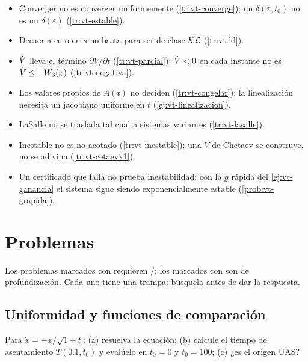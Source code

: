 \begin{trampa}[title={\faBug\hspace{0.45em}Las trampas del capítulo, en una caja}]{}
\begin{itemize}
  \item Converger no es converger uniformemente (\cref{tr:vt-converge}); un $\delta(\varepsilon,t_0)$ no es un $\delta(\varepsilon)$ (\cref{tr:vt-estable}).
  \item Decaer a cero en $s$ no basta para ser de clase $\mathcal{KL}$ (\cref{tr:vt-kl}).
  \item $\dot V$ lleva el término $\partial V/\partial t$ (\cref{tr:vt-parcial}); $\dot V<0$ en cada instante no es $\dot V\le-W_3(x)$ (\cref{tr:vt-negativa}).
  \item Los valores propios de $A(t)$ no deciden (\cref{tr:vt-congelar}); la linealización necesita un jacobiano uniforme en $t$ (\cref{ej:vt-linealizacion}).
  \item LaSalle no se traslada tal cual a sistemas variantes (\cref{tr:vt-lasalle}).
  \item Inestable no es no acotado (\cref{tr:vt-inestable}); una $V$ de Chetaev se construye, no se adivina (\cref{tr:vt-cetaevx1}).
  \item Un certificado que falla no prueba inestabilidad: con la $g$ rápida del \cref{ej:vt-ganancia} el sistema sigue siendo exponencialmente estable (\cref{prob:vt-grapida}).
\end{itemize}
\end{trampa}

\section{Problemas}
\label{sec:vt-problemas}

Los problemas marcados con \etiquetaM{} requieren \matlab/\simulink; los marcados con \etiquetaEstrella{} son de profundización. Cada uno tiene una trampa: búsquela antes de dar la respuesta.

\subsection*{Uniformidad y funciones de comparación}

\begin{problema}\label{prob:vt-raiz}
Para $\dot x=-x/\sqrt{1+t}$: (a) resuelva la ecuación; (b) calcule el tiempo de asentamiento $T(0.1,t_0)$ y evalúelo en $t_0=0$ y $t_0=100$; (c) ¿es el origen UAS?
\end{problema}

